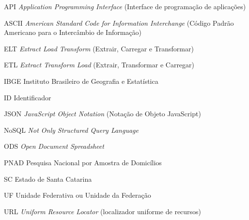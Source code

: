 \begin{siglas}
    \item[API] \textit{Application Programming Interface} (Interface de programação de aplicações)
    \item[ASCII] \textit{American Standard Code for Information Interchange} (Código Padrão Americano para o Intercâmbio de Informação)
    \item[ELT] \textit{Extract Load Transform} (Extrair, Carregar e Transformar)
    \item[ETL] \textit{Extract Transform Load} (Extrair, Transformar e Carregar)
    \item[IBGE] Instituto Brasileiro de Geografia e Estatística
    \item[ID] Identificador
    \item[JSON] \textit{JavaScript Object Notation} (Notação de Objeto JavaScript)
    \item[NoSQL] \textit{Not Only Structured Query Language}
    \item[ODS] \textit{Open Document Spreadsheet}
    \item[PNAD] Pesquisa Nacional por Amostra de Domicílios 
    \item[SC] Estado de Santa Catarina
    \item[UF] Unidade Federativa ou Unidade da Federação
    \item[URL] \textit{Uniform Resource Locator} (localizador uniforme de recursos)
  \end{siglas}
  
